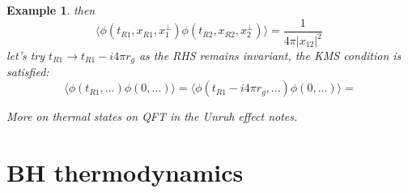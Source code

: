 \documentclass[10pt,
 article,
 amsmath,amssymb
]{revtex4-2}
\newtheorem{example}[theorem]{Example}
\begin{document}
\begin{example}
 then 
 \begin{equation}
     \langle \phi(t_{R1},x_{R1},x_1^\perp) \phi(t_{R2},x_{R2},x_2^\perp)\rangle=\frac{1}{4\pi |x_{12}|^2}\
 \end{equation}
 let's try $t_{R1}\to t_{R1}-i4\pi r_g$ as the RHS remains invariant, the KMS condition is satisfied:
 \begin{equation}
     \langle \phi(t_{R1},...) \phi(0,...)\rangle=   \langle \phi(t_{R1}-i 4\pi r_g,...) \phi(0,...)\rangle=
 \end{equation}
 
 More on thermal states on QFT in the Unruh effect notes. 
 
\end{example}


\section{BH thermodynamics}
\end{document}
